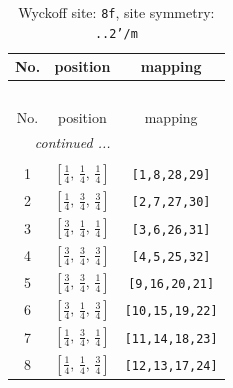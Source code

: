 \documentclass[fleqn,8pt]{jsarticle}
\begin{document}
\begin{longtable}{ccc}
\caption{Wyckoff site: {\tt 8f}, site symmetry: {\tt ..2'/m}}
 \\
 \hline \hline
No. & position & mapping \\ \hline \endfirsthead

\multicolumn{2}{l}{\tablename\ \thetable{}} \\
 \hline \hline
No. & position & mapping \\ \hline \endhead

 \hline \hline
\multicolumn{2}{r}{\footnotesize\it continued ...} \\ \endfoot

 \hline \hline
\multicolumn{2}{r}{} \\ \endlastfoot

1 & $\left[ \frac{1}{4},\, \frac{1}{4},\, \frac{1}{4} \right]$ & {\tt [1,8,28,29]} \\ \hline
2 & $\left[ \frac{1}{4},\, \frac{3}{4},\, \frac{3}{4} \right]$ & {\tt [2,7,27,30]} \\ \hline
3 & $\left[ \frac{3}{4},\, \frac{1}{4},\, \frac{1}{4} \right]$ & {\tt [3,6,26,31]} \\ \hline
4 & $\left[ \frac{3}{4},\, \frac{3}{4},\, \frac{3}{4} \right]$ & {\tt [4,5,25,32]} \\ \hline
5 & $\left[ \frac{3}{4},\, \frac{3}{4},\, \frac{1}{4} \right]$ & {\tt [9,16,20,21]} \\ \hline
6 & $\left[ \frac{3}{4},\, \frac{1}{4},\, \frac{3}{4} \right]$ & {\tt [10,15,19,22]} \\ \hline
7 & $\left[ \frac{1}{4},\, \frac{3}{4},\, \frac{1}{4} \right]$ & {\tt [11,14,18,23]} \\ \hline
8 & $\left[ \frac{1}{4},\, \frac{1}{4},\, \frac{3}{4} \right]$ & {\tt [12,13,17,24]} \\
\end{longtable}
\renewcommand{\arraystretch}{1.2}
\end{document}
